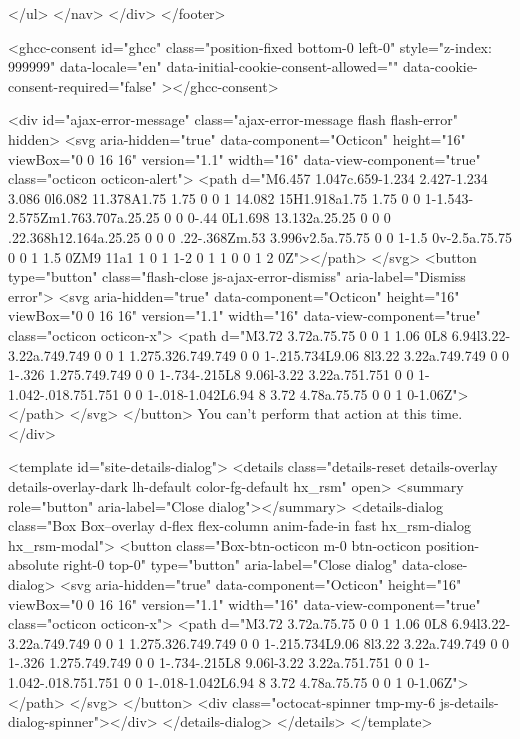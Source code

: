 {{{{{{{      </ul>
    </nav>
  </div>
</footer>



    <ghcc-consent id="ghcc" class="position-fixed bottom-0 left-0" style="z-index: 999999"
      data-locale="en"
      data-initial-cookie-consent-allowed=""
      data-cookie-consent-required="false"
    ></ghcc-consent>




  <div id="ajax-error-message" class="ajax-error-message flash flash-error" hidden>
    <svg aria-hidden="true" data-component="Octicon" height="16" viewBox="0 0 16 16" version="1.1" width="16" data-view-component="true" class="octicon octicon-alert">
    <path d="M6.457 1.047c.659-1.234 2.427-1.234 3.086 0l6.082 11.378A1.75 1.75 0 0 1 14.082 15H1.918a1.75 1.75 0 0 1-1.543-2.575Zm1.763.707a.25.25 0 0 0-.44 0L1.698 13.132a.25.25 0 0 0 .22.368h12.164a.25.25 0 0 0 .22-.368Zm.53 3.996v2.5a.75.75 0 0 1-1.5 0v-2.5a.75.75 0 0 1 1.5 0ZM9 11a1 1 0 1 1-2 0 1 1 0 0 1 2 0Z"></path>
</svg>
    <button type="button" class="flash-close js-ajax-error-dismiss" aria-label="Dismiss error">
      <svg aria-hidden="true" data-component="Octicon" height="16" viewBox="0 0 16 16" version="1.1" width="16" data-view-component="true" class="octicon octicon-x">
    <path d="M3.72 3.72a.75.75 0 0 1 1.06 0L8 6.94l3.22-3.22a.749.749 0 0 1 1.275.326.749.749 0 0 1-.215.734L9.06 8l3.22 3.22a.749.749 0 0 1-.326 1.275.749.749 0 0 1-.734-.215L8 9.06l-3.22 3.22a.751.751 0 0 1-1.042-.018.751.751 0 0 1-.018-1.042L6.94 8 3.72 4.78a.75.75 0 0 1 0-1.06Z"></path>
</svg>
    </button>
    You can’t perform that action at this time.
  </div>

    <template id="site-details-dialog">
  <details class="details-reset details-overlay details-overlay-dark lh-default color-fg-default hx_rsm" open>
    <summary role="button" aria-label="Close dialog"></summary>
    <details-dialog class="Box Box--overlay d-flex flex-column anim-fade-in fast hx_rsm-dialog hx_rsm-modal">
      <button class="Box-btn-octicon m-0 btn-octicon position-absolute right-0 top-0" type="button" aria-label="Close dialog" data-close-dialog>
        <svg aria-hidden="true" data-component="Octicon" height="16" viewBox="0 0 16 16" version="1.1" width="16" data-view-component="true" class="octicon octicon-x">
    <path d="M3.72 3.72a.75.75 0 0 1 1.06 0L8 6.94l3.22-3.22a.749.749 0 0 1 1.275.326.749.749 0 0 1-.215.734L9.06 8l3.22 3.22a.749.749 0 0 1-.326 1.275.749.749 0 0 1-.734-.215L8 9.06l-3.22 3.22a.751.751 0 0 1-1.042-.018.751.751 0 0 1-.018-1.042L6.94 8 3.72 4.78a.75.75 0 0 1 0-1.06Z"></path>
</svg>
      </button>
      <div class="octocat-spinner tmp-my-6 js-details-dialog-spinner"></div>
    </details-dialog>
  </details>
</template>

}}}}}}}
